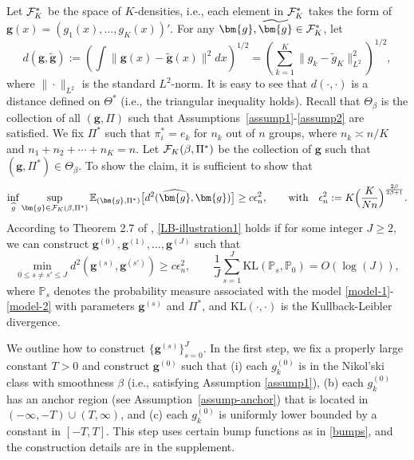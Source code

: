 \documentclass[preprint,11pt]{article}
\newcommand{\mbb}{\mathbb}
\numberwithin{equation}{section}
\newcommand{\beq}{\begin{equation}}
\newcommand{\eeq}{\end{equation}}
\begin{document}
Let ${\cal F}_K^*$ be the space of $K$-densities, i.e., each element in ${\cal F}_K^*$ takes the form of $\bm{g}(x)=(g_1(x),\ldots,g_K(x))'$. For any $\bm{g}, \widetilde{\bm{g}}\in {\cal F}_K^*$, let  
\[
d(\bm{g}, \widetilde{\bm{g}}) := \left(\int \|\bm{g}(x)-\widetilde{\bm{g}}(x)\|^2dx\right)^{1/2}=\left(\sum_{k=1}^K\|g_k-\tilde{g}_K\|^2_{L^2}\right)^{1/2}, 
\]
where $\|\cdot\|_{L^2}$ is the standard $L^2$-norm. It is easy to see that $d(\cdot,\cdot)$ is a distance defined on $\Theta^*$ (i.e., the triangular inequality holds). Recall that $\Theta_{\beta}$ is the collection of all $({\boldsymbol g}, \Pi)$ such that Assumptions~\ref{assump1}-\ref{assump2} are satisfied. We fix $\Pi^*$ such that $\pi^*_i=e_k$ for $n_k$ out of $n$ groups, where $n_k\asymp n/K$ and $n_1+n_2+\cdots +n_K=n$. Let ${\cal F}_{K}(\beta, \Pi^*)$ be the collection of $\bm{g}$ such that $(\bm{g}, \Pi^*)\in\Theta_\beta$. To show the claim, it is sufficient to show that 
\beq \label{LB-illustration1}
\inf_{\widehat{g}} \sup_{\bm{g}\in{\cal F}_K(\beta, \Pi^*)} \mathbb{E}_{(\bm{g}, \Pi^*)} \bigl[d^2(\widehat{\bm{g}}, \bm{g})\bigr]\geq c\epsilon^2_n, \qquad \mbox{with}\quad \epsilon^2_n:= K\Bigl(\frac{K}{Nn}\Bigr)^{\frac{2\beta}{2\beta+1}}. 
\eeq
According to Theorem 2.7 of \cite{tsybakov2009introduction}, \eqref{LB-illustration1} holds if for some integer $J\geq 2$, we can construct $\bm{g}^{(0)}, \bm{g}^{(1)}, \ldots, \bm{g}^{(J)}$ such that 
\beq \label{LB-illustration2}
\min_{0\leq s\neq s'\leq J}d^2(\bm{g}^{(s)}, \bm{g}^{(s')})\geq c\epsilon_n^2, \qquad \frac{1}{J}\sum_{s=1}^J \mathrm{KL}(\mbb{P}_s,\mbb{P}_0) = O(\log(J)),
\eeq
where $\mbb{P}_s$ denotes the probability measure associated with the model \eqref{model-1}-\eqref{model-2} with parameters $\bm{g}^{(s)}$ and $\Pi^*$, and $\text{KL}(\cdot,\cdot)$ is the Kullback-Leibler divergence. 

We outline how to construct $\{\bm{g}^{(s)}\}_{s=0}^J$. In the first step, we fix a properly large constant $T>0$ and construct $\bm{g}^{(0)}$ such that (i) each $g_k^{(0)}$ is in the Nikol’ski class with smoothness $\beta$ (i.e., satisfying Assumption \ref{assump1}), (b) each $g_k^{(0)}$ has an anchor region (see Assumption~\ref{assump-anchor}) that is located in $(-\infty, -T)\cup (T, \infty)$, and (c) each $g_k^{(0)}$ is uniformly lower bounded by a constant in $[-T, T]$. This step uses certain bump functions as in \eqref{bumps}, and the construction details are in the supplement. 
\end{document}
